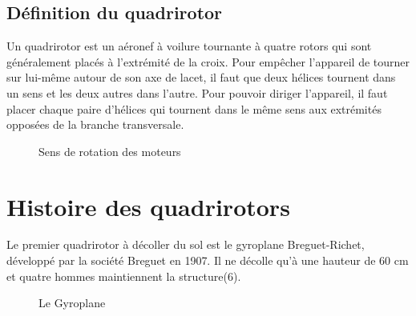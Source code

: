 	\subsection{Définition du quadrirotor}
Un quadrirotor est un aéronef à voilure tournante à quatre rotors qui sont généralement placés à l'extrémité de la croix. Pour empêcher l'appareil de tourner sur lui-même autour de son axe de lacet, il faut que deux hélices tournent dans un sens et les deux autres dans l'autre. Pour pouvoir diriger l'appareil, il faut placer chaque paire d'hélices qui tournent dans le même sens aux extrémités opposées de la branche transversale.
	\begin{figure}[h] 
	\begin{center} 
		\centering
{}	
	\end{center}
	\caption{Sens de rotation des moteurs }
	\end{figure}
	\section{Histoire des quadrirotors}
	Le premier quadrirotor à décoller du sol est le gyroplane Breguet-Richet, développé par la société Breguet en 1907. Il ne décolle qu'à une hauteur de 60 cm et quatre hommes maintiennent la structure(6). 
	\begin{figure}[h] 
	\begin{center} 
		\centering
		
	\end{center}
	\caption{Le Gyroplane }
	\end{figure}

